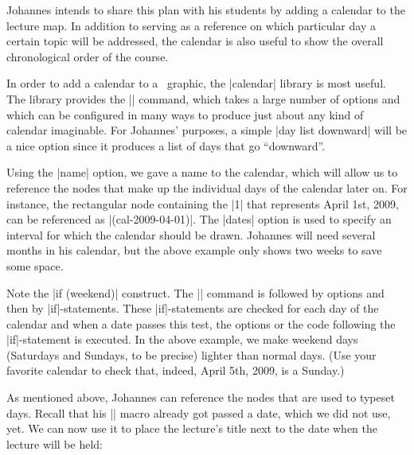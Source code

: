 Johannes intends to share this plan with his students by adding a calendar to
the lecture map. In addition to serving as a reference on which particular day
a certain  topic will be addressed, the calendar is also useful to show the
overall chronological order of the course.

In order to add a calendar to a \tikzname\ graphic, the |calendar| library is
most useful. The library provides the |\calendar| command, which takes a large
number of options and which can be configured in many ways to produce just
about any kind of calendar imaginable. For Johannes' purposes, a simple
|day list downward| will be a nice option since it produces a list of days that
go ``downward''.
%
\begin{codeexample}[
    leave comments,
    preamble={\usetikzlibrary{calendar}},
]
\tiny
{}
\end{codeexample}

Using the |name| option, we gave a name to the calendar, which will allow us to
reference the nodes that make up the individual days of the calendar later on.
For instance, the rectangular node containing the |1| that represents April
1st, 2009, can be referenced as |(cal-2009-04-01)|. The |dates| option is used
to specify an interval for which the calendar should be drawn. Johannes will
need several months in his calendar, but the above example only shows two weeks
to save some space.

Note the |if (weekend)| construct. The |\calendar| command is followed by
options and then by |if|-statements. These |if|-statements are checked for each
day of the calendar and when a date passes this test, the options or the code
following the |if|-statement is executed. In the above example, we make weekend
days (Saturdays and Sundays, to be precise) lighter than normal days. (Use your
favorite calendar to check that, indeed, April 5th, 2009, is a Sunday.)

As mentioned above, Johannes can reference the nodes that are used to typeset
days. Recall that his |\lecture| macro already got passed a date, which we did
not use, yet. We can now use it to place the lecture's title next to the date
when the lecture will be held:
%
\begin{codeexample}
\def\lecture#1#2#3#4#5#6{
  \node [annotation, #3, scale=0.65, text width=4cm, inner sep=2mm] at (#4) {
    Lecture #1: \textcolor{orange}{\textbf{#2}}
    \list{--}{\topsep=2pt\itemsep=0pt\parsep=0pt
              \parskip=0pt\labelwidth=8pt\leftmargin=8pt
              \itemindent=0pt\labelsep=2pt}
    #5
    \endlist
  };
  \node [anchor=base west] at (cal-#6.base east) {\textcolor{orange}{\textbf{#2}}};
}
\end{codeexample}
\def\lecture#1#2#3#4#5#6{
  \node [anchor=base west] at (cal-#6.base east) {\textcolor{orange}{\textbf{#2}}};
}

